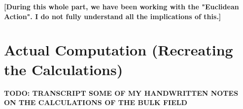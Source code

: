 \documentclass[12pt]{article}
\begin{document}
\vspace{.25cm}

\textbf{[During this whole part, we have been working with the "Euclidean Action". I do not fully understand all the implications of this.]}

\newpage

\section{Actual Computation (Recreating the Calculations)}

\textbf{TODO: TRANSCRIPT SOME OF MY HANDWRITTEN NOTES ON THE CALCULATIONS OF THE BULK FIELD}
\end{document}

